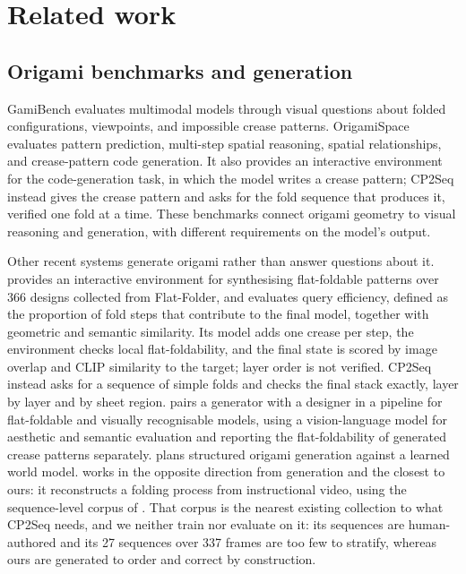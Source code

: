 \section{Related work}
\label{sec:related}

\subsection{Origami benchmarks and generation}
\label{sec:related-benchmarks}

GamiBench \citep{gamibench} evaluates multimodal models through visual questions about folded
configurations, viewpoints, and impossible crease patterns. OrigamiSpace \citep{origamispace} evaluates pattern
prediction, multi-step spatial reasoning, spatial relationships, and crease-pattern code generation.
It also provides an interactive environment for the code-generation task, in which the model
writes a crease pattern; CP2Seq instead gives the crease pattern and asks for the fold sequence
that produces it, verified one fold at a time. These benchmarks connect
origami geometry to visual reasoning and generation, with different requirements on the model's
output.

Other recent systems generate origami rather than answer questions about it.
\citet{origamibench} provides an interactive environment for synthesising flat-foldable patterns
over 366
designs collected from Flat-Folder, and evaluates query efficiency, defined as the proportion of
fold steps that contribute to the final model, together with geometric and semantic similarity.
Its model adds one crease per step, the environment checks local flat-foldability, and the final
state is scored by image overlap and CLIP similarity to the target; layer order is not verified.
CP2Seq instead asks for a sequence of simple folds and checks the final stack exactly, layer by
layer and by sheet region.
\citet{corigami} pairs a generator with a designer in a pipeline for flat-foldable and visually
recognisable models, using a vision-language model for aesthetic and semantic evaluation and
reporting the flat-foldability of generated crease patterns separately.
\citet{learn2fold} plans structured origami generation against a learned world model.
\citet{foldingagent} works in the opposite direction from generation and the closest to ours: it
reconstructs a folding process from instructional video, using the sequence-level corpus of
\citet{purelandfold}. That corpus is the nearest existing collection to what CP2Seq needs, and we
neither train nor evaluate on it: its sequences are human-authored and its 27 sequences over 337
frames are too few to stratify, whereas ours are generated to order and correct by construction.

